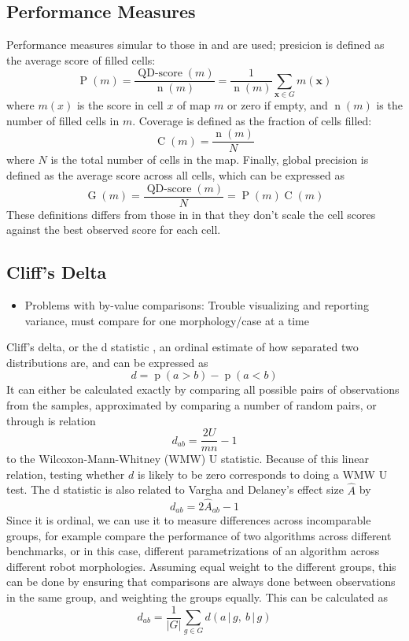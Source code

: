 \documentclass[sigconf, anonymous=false]{acmart}
\newcommand{\vx}{\mathbf{x}}
\newcommand{\paren}[1]{\left(#1\right)}
\newcommand{\opp}[2]{\operatorname{#1}\paren{#2}}
\begin{document}
\subsection{Performance Measures}\label{method:meas}
\label{sec:perfmeas}

Performance measures simular to those in \cite{Mouret2015} and \cite{Pugh2016} are used;
presicion is defined as the average score of filled cells: 
\[ \opp{P}{m} = \frac{\opp{QD-score}{m}}{\opp{n}{m}} = \frac{1}{\opp{n}{m}}\sum_{\vx \in G}m\paren{\vx} \]
where $m\paren{x}$ is the score in cell $x$ of map $m$ or zero if empty, and $\opp{n}{m}$ is the number of filled cells in $m$.
Coverage is defined as the fraction of cells filled:
\[ \opp{C}{m} = \frac{\opp{n}{m}}{N} \]
where $N$ is the total number of cells in the map. 
Finally, global precision is defined as the average score across all cells, which can be expressed as
\[ \opp{G}{m} = \frac{\opp{QD-score}{m}}{N} = \opp{P}{m}\opp{C}{m} \]
These definitions differs from those in \cite{Mouret2015} in that they don't scale the cell scores against the best observed score for each cell.

\subsection{Cliff's Delta}\label{method:effect-size}
\begin{itemize}
\item Problems with by-value comparisons: Trouble visualizing and reporting variance, must compare for one morphology/case at a time
\end{itemize}
Cliff's delta, or the d statistic \cite{Cliff1993}, an ordinal estimate of how separated two distributions are, and can be expressed as 
\begin{equation} \label{eq:d}
d = \opp{p}{a > b} - \opp{p}{a < b}
\end{equation}
It can either be calculated exactly by comparing all possible pairs of observations from the samples, approximated by comparing a number of random pairs, or through is relation 
\[ d_{ab} = \frac{2U}{mn} - 1 \]
to the Wilcoxon-Mann-Whitney (WMW) U statistic. Because of this linear relation, testing whether $d$ is likely to be zero corresponds to doing a WMW U test. The d statistic is also related to Vargha and Delaney's effect size $\hat{A}$ \cite{Vargha2000} by
\[ d_{ab} = 2\hat{A}_{ab} - 1\]
Since it is ordinal, we can use it to measure differences across incomparable groups, for example compare the performance of two algorithms across different benchmarks, or in this case, different parametrizations of an algorithm across different robot morphologies. Assuming equal weight to the different groups, this can be done by ensuring that comparisons are always done between observations in the same group, and weighting the groups equally. This can be calculated as
\[ d_{ab} = \frac{1}{|G|}\sum_{g\in G} d\paren{a\,|\,g,\ b\,|\,g} \]
\end{document}
